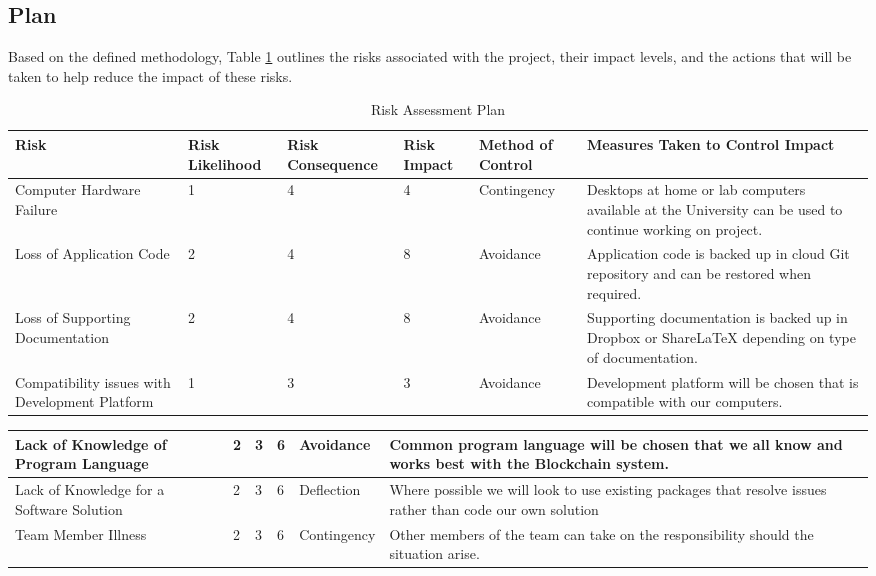 \documentclass{article}
\begin{document}
\subsection{Plan}

Based on the defined methodology, Table \ref{table:risks} outlines the risks associated with the project, their impact levels, and the actions that will be taken to help reduce the impact of these risks.
\newpage
\begin{landscape}
\begin{table}[ht]
    \caption{Risk Assessment Plan}
    \label{table:risks}
    \centering
    \begin{tabularx}{\linewidth}{|X|X|X|X|X|X|} \hline
    \textbf{Risk} & \textbf{Risk Likelihood} & \textbf{Risk Consequence} &\textbf{Risk Impact} & \textbf{Method of Control} & \textbf{Measures Taken to Control Impact} \tabularnewline
    \hline
    Computer Hardware Failure & 1 & 4 & 4 & Contingency & Desktops at home or lab computers available at the University can be used to continue working on project. \\ \hline
    Loss of Application Code & 2 & 4 & 8 & Avoidance & Application code is backed up in cloud Git repository and can be restored when required. \\ \hline
    Loss of Supporting Documentation & 2 & 4 & 8 & Avoidance & Supporting documentation is backed up in Dropbox or ShareLaTeX depending on type of documentation. \\ \hline
    Compatibility issues with Development Platform & 1 & 3 & 3 & Avoidance & Development platform will be chosen that is compatible with our computers. \\ \hline
    \end{tabularx}
\end{table}
\newpage
\begin{table}[ht]
    \centering
    \begin{tabularx}{\linewidth}{|X|X|X|X|X|X|} \hline
    Lack of Knowledge of Program Language & 2 & 3 & 6 & Avoidance & Common program language will be chosen that we all know and works best with the Blockchain system. \\ \hline
    Lack of Knowledge for a Software Solution & 2 & 3 & 6 & Deflection & Where possible we will look to use existing packages that resolve issues rather than code our own solution \\ \hline
    Team Member Illness & 2 & 3 & 6 & Contingency & Other members of the team can take on the responsibility should the situation arise. \\ \hline

\end{tabularx}
\end{table}
\end{landscape}
\end{document}
